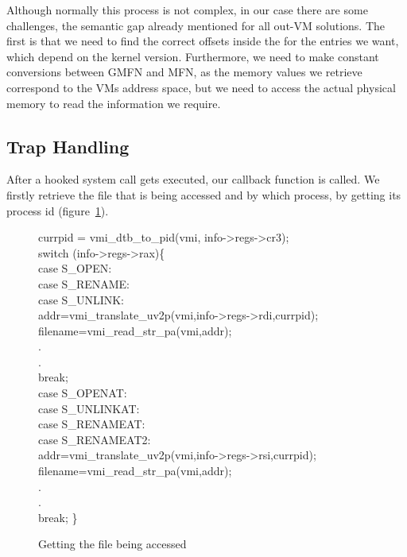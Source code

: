 \par Although normally this process is not complex, in our case there are some challenges, the semantic gap already mentioned for all out-\ac{VM} solutions. The first is that we need to find the correct offsets inside the  for the entries we want, which depend on the kernel version. Furthermore, we need to make constant conversions between \ac{GMFN} and \ac{MFN}, as the memory values we retrieve correspond to the \ac{VM}s address space, but we need to access the actual physical memory to read the information we require.


\subsection{Trap Handling}\label{sub:handling}

After a hooked system call gets executed, our callback function is called. We firstly retrieve the file that is being accessed and by which process, by getting its process id (figure~\ref{fig:getfile}). 

\begin{figure}[ht]
\footnotesize {
	{\selectfont 
currpid = vmi\_dtb\_to\_pid(vmi, info->regs->cr3);\\
switch (info->regs->rax)\{\\
case S\_OPEN:\\
case S\_RENAME:\\
case S\_UNLINK:\\
\tab	addr=vmi\_translate\_uv2p(vmi,info->regs->rdi,currpid);\\
\tab	filename=vmi\_read\_str\_pa(vmi,addr);\\
\tab	.\\
\tab	.\\
\tab	break;\\
case S\_OPENAT:\\
case S\_UNLINKAT:\\
case S\_RENAMEAT:\\
case S\_RENAMEAT2:\\
\tab	addr=vmi\_translate\_uv2p(vmi,info->regs->rsi,currpid);\\
\tab	filename=vmi\_read\_str\_pa(vmi,addr);\\
\tab	.\\
\tab	.\\
\tab	break; \} \\
	}
}
	\caption{Getting the file being accessed}
	\label{fig:getfile}
\end{figure}


